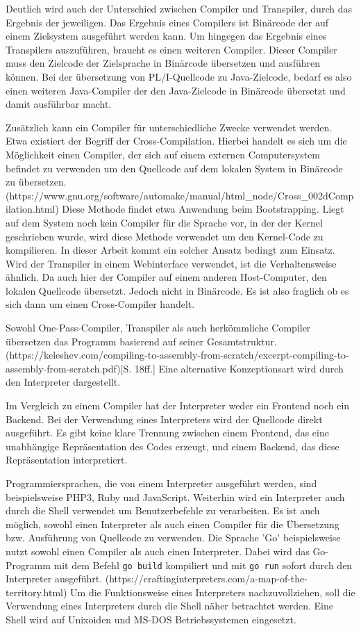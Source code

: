 Deutlich wird auch der Unterschied zwischen Compiler und Transpiler, durch das Ergebnis der jeweiligen. 
Das Ergebnis eines Compilers ist Binärcode der auf einem Zielsystem ausgeführt werden kann. Um hingegen das Ergebnis eines Transpilers auszuführen,
braucht es einen weiteren Compiler. Dieser Compiler muss den Zielcode der Zielsprache in Binärcode übersetzen und ausführen können.
Bei der übersetzung von PL/I-Quellcode zu Java-Zielcode, bedarf es also einen weiteren Java-Compiler der den Java-Zielcode in Binärcode übersetzt 
und damit ausführbar macht.  

Zusätzlich kann ein Compiler für unterschiedliche Zwecke verwendet werden. Etwa existiert der Begriff der Cross-Compilation. Hierbei handelt es sich um die Möglichkeit einen Compiler, der sich auf einem externen Computersystem befindet zu verwenden um den Quellcode auf dem lokalen System in Binärcode zu übersetzen. (https://www.gnu.org/software/automake/manual/html_node/Cross_002dCompilation.html) Diese Methode findet etwa Anwendung beim Bootstrapping. Liegt auf dem System noch kein Compiler für die Sprache vor, in der der Kernel geschrieben wurde, wird diese Methode verwendet um den Kernel-Code zu kompilieren. 
In dieser Arbeit kommt ein solcher Ansatz bedingt zum Einsatz. Wird der Transpiler in einem Webinterface verwendet, ist die Verhaltensweise ähnlich.
Da auch hier der Compiler auf einem anderen Host-Computer, den lokalen Quellcode übersetzt. Jedoch nicht in Binärcode. Es ist also fraglich ob es sich dann um einen Cross-Compiler handelt.

Sowohl One-Pass-Compiler, Transpiler als auch herkömmliche Compiler übersetzen das Programm basierend auf seiner Gesamtstruktur. (https://keleshev.com/compiling-to-assembly-from-scratch/excerpt-compiling-to-assembly-from-scratch.pdf)[S. 18ff.] Eine alternative Konzeptionsart wird durch den Interpreter dargestellt.

Im Vergleich zu einem Compiler hat der Interpreter weder ein Frontend noch ein Backend. Bei der Verwendung eines Interpreters wird der Quellcode direkt ausgeführt. Es gibt keine klare Trennung zwischen einem Frontend, das eine unabhängige Repräsentation des Codes erzeugt, und einem Backend, das diese Repräsentation interpretiert. 

Programmiersprachen, die von einem Interpreter ausgeführt werden, sind beispielsweise PHP3, Ruby und JavaScript. Weiterhin wird ein Interpreter auch durch die Shell verwendet um Benutzerbefehle zu verarbeiten. Es ist auch möglich, sowohl einen Interpreter als auch einen Compiler für die Übersetzung bzw. Ausführung von Quellcode zu verwenden. Die Sprache 'Go' beispielsweise nutzt sowohl einen Compiler als auch einen Interpreter. Dabei wird das Go-Programm mit dem Befehl \verb+go build+ kompiliert und mit \verb+go run+ sofort durch den Interpreter ausgeführt. (https://craftinginterpreters.com/a-map-of-the-territory.html)
Um die Funktionsweise eines Interpreters nachzuvollziehen, soll die Verwendung eines Interpreters durch die Shell näher betrachtet werden. Eine Shell wird auf Unixoiden und MS-DOS Betriebssystemen eingesetzt.
  
